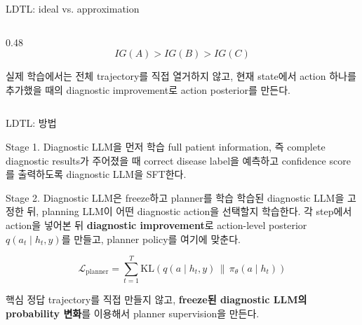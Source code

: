 \documentclass[
11pt,notheorems,hyperref={pdfauthor=whatever}
]{beamer}
\begin{document}
\begin{frame}[t]{LDTL: ideal vs. approximation}
\begin{columns}[T,onlytextwidth]
\begin{column}{0.48\textwidth}
\vspace{0.15em}
{\small
\[
IG(A)>IG(B)>IG(C)
\]
}

{\scriptsize 실제 학습에서는 전체 trajectory를 직접 열거하지 않고, 현재 state에서 action 하나를 추가했을 때의 diagnostic improvement로 action posterior를 만든다.}
\end{column}
\end{columns}
\end{frame}

\begin{frame}{LDTL: 방법}
\vspace{0.05em}
\begin{block}{Stage 1. Diagnostic LLM을 먼저 학습}
\small
full patient information, 즉 complete diagnostic results가 주어졌을 때 correct disease label을 예측하고 confidence score를 출력하도록 diagnostic LLM을 SFT한다.
\end{block}

\vspace{0.45em}
\begin{block}{Stage 2. Diagnostic LLM은 freeze하고 planner를 학습}
\small
학습된 diagnostic LLM을 고정한 뒤, planning LLM이 어떤 diagnostic action을 선택할지 학습한다. 각 step에서 action을 넣어본 뒤 \textbf{diagnostic improvement}로 action-level posterior \(q(a_t\mid h_t,y)\)를 만들고, planner policy를 여기에 맞춘다.
\end{block}

\vspace{0.35em}
\[
\mathcal{L}_{\mathrm{planner}}
=
\sum_{t=1}^{T}
\mathrm{KL}\!\left(q(a\mid h_t,y)\,\|\,\pi_\theta(a\mid h_t)\right)
\]

\vspace{0.15em}
\begin{block}{핵심}
\small
정답 trajectory를 직접 만들지 않고, \textbf{freeze된 diagnostic LLM의 probability 변화}를 이용해서 planner supervision을 만든다.
\end{block}
\end{frame}
\end{document}
